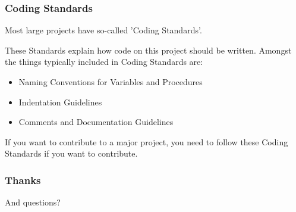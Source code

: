 \begin{frame}[fragile]
  \frametitle{Coding Standards}

  Most large projects have so-called 'Coding Standards'.

  These Standards explain how code on this project should be written.
  Amongst the things typically included in Coding Standards are:

  \begin{itemize}
    \item Naming Conventions for Variables and Procedures
    \item Indentation Guidelines
    \item Comments and Documentation Guidelines
  \end{itemize}

  If you want to contribute to a major project, you need to follow these Coding Standards if you want to contribute.

\end{frame}

\begin{frame}[fragile]
  \frametitle{Thanks}

  And questions?

\end{frame}

